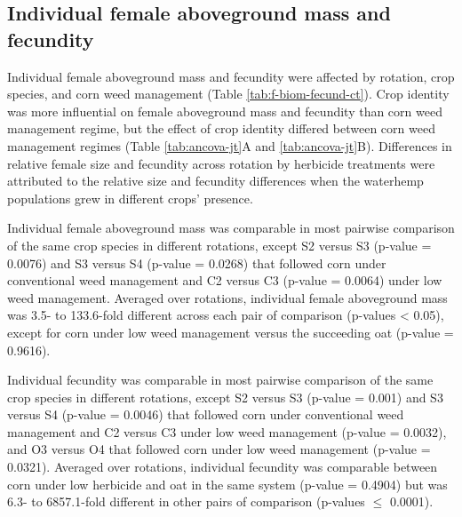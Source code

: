 \documentclass[
]{article}
\begin{document}
\hypertarget{individual-female-aboveground-mass-and-fecundity-2}{%
\subsection*{Individual female aboveground mass and fecundity}\label{individual-female-aboveground-mass-and-fecundity-2}}

Individual female aboveground mass and fecundity were affected by rotation, crop species, and corn weed management (Table \ref{tab:f-biom-fecund-ct}). Crop identity was more influential on female aboveground mass and fecundity than corn weed management regime, but the effect of crop identity differed between corn weed management regimes (Table \ref{tab:ancova-jt}A and \ref{tab:ancova-jt}B). Differences in relative female size and fecundity across rotation by herbicide treatments were attributed to the relative size and fecundity differences when the waterhemp populations grew in different crops' presence.

Individual female aboveground mass was comparable in most pairwise comparison of the same crop species in different rotations, except S2 versus S3 (p-value = 0.0076) and S3 versus S4 (p-value = 0.0268) that followed corn under conventional weed management and C2 versus C3 (p-value = 0.0064) under low weed management. Averaged over rotations, individual female aboveground mass was 3.5- to 133.6-fold different across each pair of comparison (p-values \textless{} 0.05), except for corn under low weed management versus the succeeding oat (p-value = 0.9616).

Individual fecundity was comparable in most pairwise comparison of the same crop species in different rotations, except S2 versus S3 (p-value = 0.001) and S3 versus S4 (p-value = 0.0046) that followed corn under conventional weed management and C2 versus C3 under low weed management (p-value = 0.0032), and O3 versus O4 that followed corn under low weed management (p-value = 0.0321). Averaged over rotations, individual fecundity was comparable between corn under low herbicide and oat in the same system (p-value = 0.4904) but was 6.3- to 6857.1-fold different in other pairs of comparison (p-values \(\leq\) 0.0001).
\end{document}
